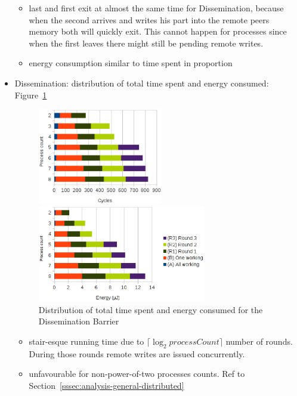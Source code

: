 \documentclass[a4paper, 10pt]{article}
\begin{document}
\begin{itemize}
\begin{itemize}
			\item last and first exit at almost the same time for Dissemination, because when the second arrives and writes his part into the remote peers memory both will quickly exit. This cannot happen for processes since when the first leaves there might still be pending remote writes.
			\item energy consumption similar to time spent in proportion
		\end{itemize}
	\item Dissemination: distribution of total time spent and energy consumed: Figure~\ref{fig:d-work-100-partition}
		\begin{figure}[htbp]
			\centering
			\begin{minipage}{0.43\linewidth}
				\includegraphics[height=4.2cm]{charts/d-time-work-100-partition}
			\end{minipage}
			\begin{minipage}{0.56\linewidth}
				\includegraphics[height=4.2cm]{charts/d-energy-work-100-partition}
			\end{minipage}
			\caption{Distribution of total time spent and energy consumed for the Dissemination Barrier}
			\label{fig:d-work-100-partition}
		\end{figure}
		\begin{itemize}
			\item stair-esque running time due to $\lceil \log_2 \mathit{processCount} \rceil$ number of rounds. During those rounds remote writes are issued concurrently.
			\item unfavourable for non-power-of-two processes counts. Ref to Section~\ref{sssec:analysis-general-distributed}

\end{itemize}
\end{itemize}
\end{document}
